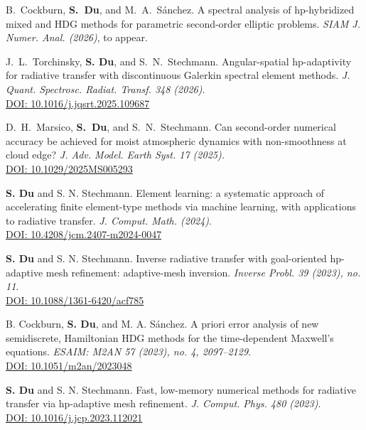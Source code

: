 \documentclass[11pt]{res}
\newenvironment{cvenumerate}{\begin{etaremune}\itemsep -2pt}{\end{etaremune}\vspace{-5pt}}
\begin{document}
\begin{resume}
\begin{cvenumerate}
\item[]
\item[]

\hspace{-1cm}{\bf Peer-reviewed}
\item B.~Cockburn, {\bf S.~Du}, and M.~A.~Sánchez. A spectral analysis of hp-hybridized mixed and HDG methods for parametric second-order elliptic problems. {\sl SIAM J. Numer. Anal. (2026)}, to appear.

\item
J.~L.~Torchinsky, 
{\bf S. Du}, and S.~N.~Stechmann.
Angular-spatial hp-adaptivity for radiative transfer with discontinuous Galerkin spectral element methods.
{\sl J. Quant. Spectrosc. Radiat. Transf. 348 (2026)}.\\
\href{https://doi.org/10.1016/j.jqsrt.2025.109687}{DOI: 10.1016/j.jqsrt.2025.109687}

\item 
D.~H.~Marsico, {\bf S.~Du}, and S.~N.~Stechmann.
Can second-order numerical accuracy be achieved for moist atmospheric dynamics with non-smoothness at cloud edge?
{\sl J. Adv. Model. Earth Syst. 17 (2025).}\\
\href{https://doi.org/10.1029/2025MS005293}{DOI: 10.1029/2025MS005293}

\item
{\bf S. Du} and S. N. Stechmann.
Element learning: a systematic approach of accelerating finite
element-type methods via machine learning, with applications to radiative transfer. {\sl J. Comput. Math. (2024)}.\\
\href{https://doi.org/10.4208/jcm.2407-m2024-0047}{DOI: 10.4208/jcm.2407-m2024-0047}

\item
{\bf S. Du} and S. N. Stechmann. Inverse radiative transfer with goal-oriented hp-adaptive mesh refinement: adaptive-mesh inversion. {\sl Inverse Probl. 39 (2023), no. 11}.\\
\href{https://doi.org/10.1088/1361-6420/acf785}{DOI: 10.1088/1361-6420/acf785}

\item
B. Cockburn, {\bf S. Du}, and M. A. Sánchez. A priori error analysis of new semidiscrete, Hamiltonian HDG methods for the time-dependent Maxwell's equations.
{\sl ESAIM: M2AN 57 (2023), no. 4, 2097--2129}.\\
\href{https://doi.org/10.1051/m2an/2023048}{DOI: 10.1051/m2an/2023048}

\item 
{\bf S. Du} and S. N. Stechmann. Fast, low-memory numerical methods for radiative transfer via hp-adaptive mesh refinement. {\sl J. Comput. Phys. 480 (2023)}.\\
\href{https://doi.org/10.1016/j.jcp.2023.112021}{DOI: 10.1016/j.jcp.2023.112021}


\end{cvenumerate}
\end{resume}
\end{document}
